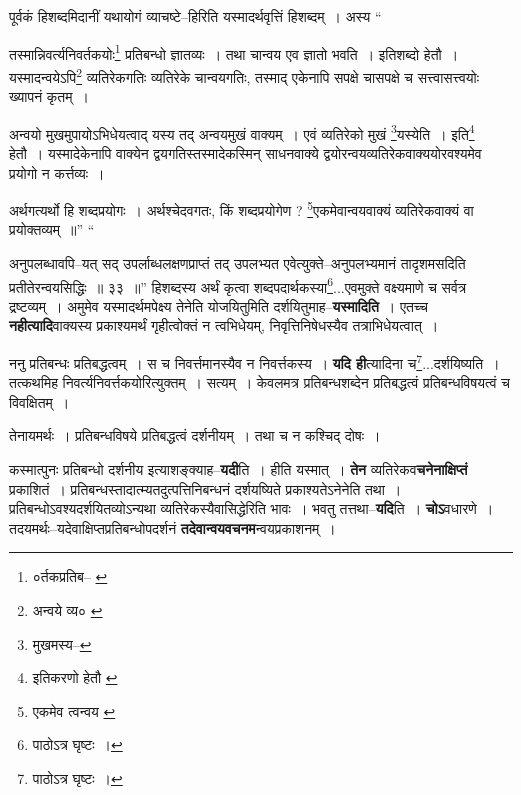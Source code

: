 \documentclass[article,12pt,a4paper]{memoir}
\begin{document}
	  \pstart पूर्वकं हिशब्दमिदानीं यथायोगं व्याचष्टे--हिरिति यस्मादर्थवृत्तिं हिशब्दम् । अस्य  \leavevmode{} “
	  
	तस्मान्निवर्त्यनिवर्तकयोः\footnote{०र्तकप्रतिब--\cite{dp-msA} \cite{dp-msD} \cite{dp-edP} \cite{dp-edH} \cite{dp-edE}} प्रतिबन्धो ज्ञातव्यः । तथा चान्वय एव ज्ञातो भवति । इतिशब्दो हेतौ । यस्मादन्वयेऽपि\footnote{अन्वये व्य० \cite{dp-msA} \cite{dp-edP} \cite{dp-edH} \cite{dp-edE} \cite{dp-edN}} व्यतिरेकगतिः व्यतिरेके चान्वयगतिः, तस्माद् एकेनापि सपक्षे चासपक्षे च सत्त्वासत्त्वयोः ख्यापनं कृतम् । 
	  
	अन्वयो मुखमुपायोऽभिधेयत्वाद् यस्य तद् अन्वयमुखं वाक्यम् । एवं व्यतिरेको मुखं \footnote{मुखमस्य--\cite{dp-msC}}\-यस्येति । इति\footnote{इतिकरणो हेतौ \cite{dp-msA}} हेतौ । यस्मादेकेनापि वाक्येन द्वयगतिस्तस्मादेकस्मिन् साधनवाक्ये द्वयोरन्वयव्यतिरेकवाक्ययोरवश्यमेव प्रयोगो न कर्त्तव्यः । 
	  
	अर्थगत्यर्थो हि शब्दप्रयोगः । अर्थश्चेदवगतः, किं शब्दप्रयोगेण ? \footnote{एकमेव त्वन्वय \cite{dp-msA} \cite{dp-edP} \cite{dp-edH} \cite{dp-edE} \cite{dp-edN}}\-एकमेवान्वयवाक्यं व्यतिरेकवाक्यं वा प्रयोक्तव्यम् ॥” “
	  
	अनुपलब्धावपि--यत् सद् उपर्लाब्धलक्षणप्राप्तं तद् उपलभ्यत एवेत्युक्ते--अनुपलभ्यमानं तादृशमसदिति प्रतीतेरन्वयसिद्धिः ॥ ३३ ॥” हिशब्दस्य अर्थं कृत्वा शब्दपदार्थकस्या\footnote{पाठोऽत्र घृष्टः ।}\-...एवमुक्ते वक्ष्यमाणे च सर्वत्र द्रष्टव्यम् । अमुमेव यस्मादर्थमपेक्ष्य तेनेति योजयितुमिति दर्शयितुमाह--\textbf{यस्मादिति} । एतच्च \textbf{नहीत्यादि}वाक्यस्य प्रकाश्यमर्थं गृहीत्वोक्तं न त्वभिधेयम्, निवृत्तिनिषेधस्यैव तत्राभिधेयत्वात् ।
	\pend
      

	  \pstart ननु प्रतिबन्धः प्रतिबद्धत्वम् । स च निवर्त्तमानस्यैव न निवर्त्तकस्य । \textbf{यदि ही}त्यादिना च\footnote{पाठोऽत्र घृष्टः ।}\-...दर्शयिष्यति । तत्कथमिह निवर्त्यनिवर्त्तकयोरित्युक्तम् । सत्यम् । केवलमत्र प्रतिबन्धशब्देन प्रतिबद्धत्वं प्रतिबन्धविषयत्वं च विवक्षितम् ।
	\pend
      

	  \pstart तेनायमर्थः । प्रतिबन्धविषये प्रतिबद्धत्वं दर्शनीयम् । तथा च न कश्चिद् दोषः ।
	\pend
      

	  \pstart कस्मात्पुनः प्रतिबन्धो दर्शनीय इत्याशङ्क्याह--\textbf{यदी}ति । हीति यस्मात् । \textbf{तेन} व्यतिरेकव\textbf{चनेनाक्षिप्तं} प्रकाशितं । प्रतिबन्धस्तादात्म्यतदुत्पत्तिनिबन्धनं दर्शयष्यिते प्रकाश्यतेऽनेनेति तथा । प्रतिबन्धोऽवश्यदर्शयितव्योऽन्यथा व्यतिरेकस्यैवासिद्धेरिति भावः । भवतु तत्तथा--\textbf{यदि}ति । \textbf{चोऽ}वधारणे । तदयमर्थः--यदेवाक्षिप्तप्रतिबन्धोपदर्शनं \textbf{तदेवान्वयवचनम}न्वयप्रकाशनम् ।
	\pend
      
\end{document}
